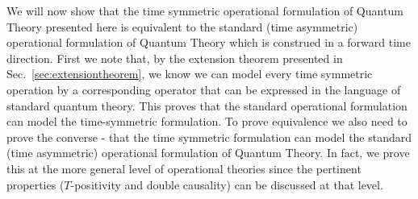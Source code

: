 \documentclass[10pt]{article}
\begin{document}
We will now show that the time symmetric operational formulation of Quantum Theory presented here is equivalent to the standard (time asymmetric) operational formulation of Quantum Theory which is construed in a forward time direction.  First we note that, by the extension theorem presented in Sec.\ \ref{sec:extensiontheorem}, we know we can model every time symmetric operation by a corresponding operator that can be expressed in the language of standard quantum theory.  This proves that the standard operational formulation can model the time-symmetric formulation.   To prove equivalence we also need to prove the converse - that the time symmetric formulation can model the standard (time asymmetric) operational formulation of Quantum Theory.  In fact, we prove this at the more general level of operational theories since the pertinent properties ($T$-positivity and double causality) can be discussed at that level.
\end{document}
